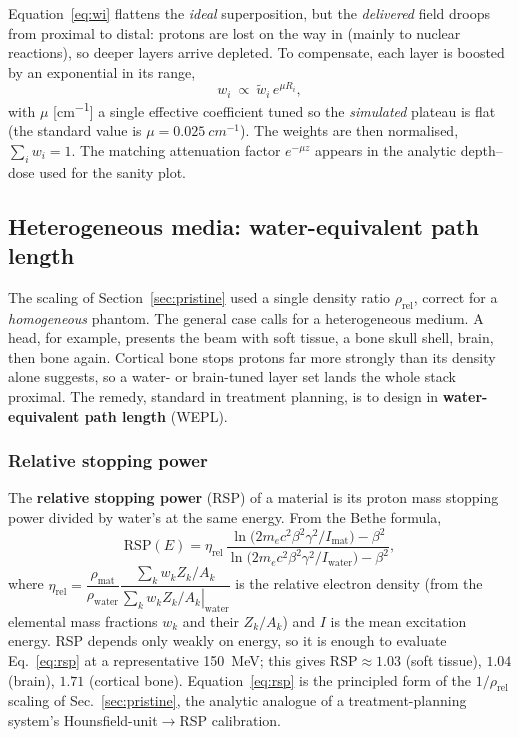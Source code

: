 \documentclass[11pt]{article}
\begin{document}
Equation~\eqref{eq:wi} flattens the \emph{ideal} superposition, but the
\emph{delivered} field droops from proximal to distal: protons are lost on the
way in (mainly to nuclear reactions), so deeper layers arrive depleted. To
compensate, each layer is boosted by an exponential in its range,
\begin{equation}
w_i\ \propto\ \tilde w_i\,e^{\mu R_i},
\label{eq:atten}
\end{equation}
with $\mu$ [\si{cm^{-1}}] a single effective coefficient tuned so the
\emph{simulated} plateau is flat (the standard value is
$\mu=\SI{0.025}{cm^{-1}}$). The weights are then normalised, $\sum_i w_i=1$. The
matching attenuation factor $e^{-\mu z}$ appears in the analytic depth--dose used
for the sanity plot.

\subsection{Heterogeneous media: water-equivalent path length}
\label{sec:wepl}

The scaling of Section~\ref{sec:pristine} used a single density ratio
$\rho_{\mathrm{rel}}$, correct for a \emph{homogeneous} phantom. The general case
calls for a heterogeneous medium. A head, for example, presents the beam with soft
tissue, a bone skull shell, brain, then bone again. Cortical bone stops protons far
more strongly than its density alone suggests, so a water- or brain-tuned layer set
lands the whole stack proximal. The remedy, standard in treatment planning, is to
design in \textbf{water-equivalent path length} (WEPL).

\subsubsection{Relative stopping power}
The \textbf{relative stopping power} (RSP) of a material is its proton mass
stopping power divided by water's at the same energy. From the Bethe formula,
\begin{equation}
\mathrm{RSP}(E)=\eta_{\mathrm{rel}}\,
\frac{\ln\!\big(2 m_e c^2\beta^2\gamma^2/I_{\mathrm{mat}}\big)-\beta^2}
{\ln\!\big(2 m_e c^2\beta^2\gamma^2/I_{\mathrm{water}}\big)-\beta^2},
\label{eq:rsp}
\end{equation}
where
$\eta_{\mathrm{rel}}=\dfrac{\rho_{\mathrm{mat}}}{\rho_{\mathrm{water}}}
\dfrac{\sum_k w_k Z_k/A_k}{\left.\sum_k w_k Z_k/A_k\right|_{\mathrm{water}}}$
is the relative electron density (from the elemental mass fractions $w_k$ and
their $Z_k/A_k$) and $I$ is the mean excitation energy. RSP depends
only weakly on energy, so it is enough to evaluate Eq.~\eqref{eq:rsp} at a representative
\SI{150}{MeV}; this gives $\mathrm{RSP}\approx1.03$ (soft tissue), $1.04$ (brain),
$1.71$ (cortical bone). Equation~\eqref{eq:rsp} is the principled form of the
$1/\rho_{\mathrm{rel}}$ scaling of Sec.~\ref{sec:pristine}, the analytic analogue
of a treatment-planning system's Hounsfield-unit$\to$RSP calibration.
\end{document}
